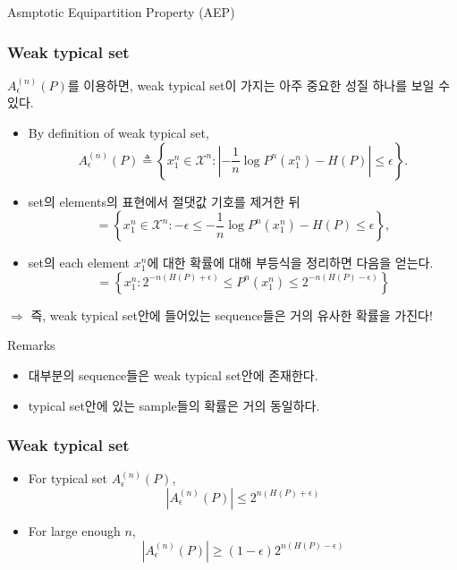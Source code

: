 \documentclass[9pt]{beamer}
\begin{document}
\begin{section}{Asmptotic Equipartition Property (AEP)}
        \begin{frame}
            \frametitle{Weak typical set}
            $A_{\epsilon}^{(n)}(P)$를 이용하면, weak typical set이 가지는 아주 중요한 성질 하나를 보일 수 있다.
            \begin{itemize}
                \item By definition of weak typical set,
                $$ A_\epsilon^{(n)}(P) \triangleq\left\{x_1^n \in \mathcal X^n:\left|-\frac{1}{n} \log P^n\left(x_1^n\right)-H(P)\right| \leq \epsilon\right\}. $$
                \item set의 elements의 표현에서 절댓값 기호를 제거한 뒤
                $$ = \left\{x_1^n \in \mathcal X^n: -\epsilon \le  -\frac{1}{n} \log P^n\left(x_1^n\right)-H(P) \leq \epsilon\right\},$$
                \item set의 each element $x_1^n$에 대한 확률에 대해 부등식을 정리하면 다음을 얻는다.
                $$ = \left\{x_1^n: 2^{-n(H(P)+\epsilon)} \leq P^n\left(x_1^n\right) \leq 2^{-n(H(P)-\epsilon)}\right\}$$
            \end{itemize}
            $\Rightarrow$ 즉, weak typical set안에 들어있는 sequence들은 \alert{거의 유사한 확률}을 가진다!
            \vspace{0.3cm}
            \begin{block}{Remarks}
                \begin{itemize}
                    \item 대부분의 sequence들은 weak typical set안에 존재한다.
                    \item typical set안에 있는 sample들의 확률은 거의 동일하다.
                \end{itemize}
            \end{block}

        \end{frame}  

        \begin{frame}
            \frametitle{Weak typical set}
            \begin{corollary}
                \begin{itemize}
                    \item For typical set $A_{\epsilon}^{(n)}(P)$,
                    $$ |A_\epsilon^{(n)}(P)| \le 2^{n(H(P)+\epsilon)} $$
                    \item For large enough $n$,
                    $$ |A_\epsilon ^{(n)} (P)| \ge (1-\epsilon) 2^{n{(H(P)-\epsilon)}} $$
                \end{itemize}
            \end{corollary}


\end{frame}
\end{section}
\end{document}
